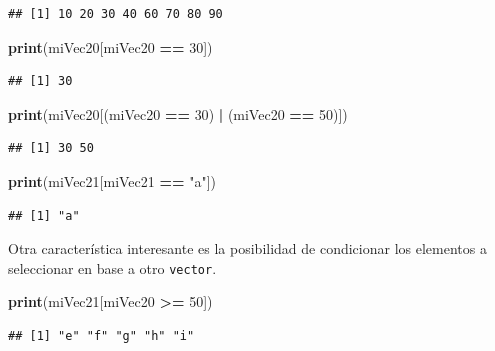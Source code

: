 \documentclass[]{book}
\newenvironment{Shaded}{\begin{snugshade}}{\end{snugshade}}
\newcommand{\KeywordTok}[1]{\textcolor[rgb]{0.13,0.29,0.53}{\textbf{#1}}}
\newcommand{\DecValTok}[1]{\textcolor[rgb]{0.00,0.00,0.81}{#1}}
\newcommand{\StringTok}[1]{\textcolor[rgb]{0.31,0.60,0.02}{#1}}
\newcommand{\OperatorTok}[1]{\textcolor[rgb]{0.81,0.36,0.00}{\textbf{#1}}}
\newcommand{\NormalTok}[1]{#1}
\begin{document}
\begin{verbatim}
## [1] 10 20 30 40 60 70 80 90
\end{verbatim}

\begin{Shaded}
\begin{Highlighting}[]
\KeywordTok{print}\NormalTok{(miVec20[miVec20 }\OperatorTok{==}\StringTok{ }\DecValTok{30}\NormalTok{])}
\end{Highlighting}
\end{Shaded}

\begin{verbatim}
## [1] 30
\end{verbatim}

\begin{Shaded}
\begin{Highlighting}[]
\KeywordTok{print}\NormalTok{(miVec20[(miVec20 }\OperatorTok{==}\StringTok{ }\DecValTok{30}\NormalTok{) }\OperatorTok{|}\StringTok{ }\NormalTok{(miVec20 }\OperatorTok{==}\StringTok{ }\DecValTok{50}\NormalTok{)])}
\end{Highlighting}
\end{Shaded}

\begin{verbatim}
## [1] 30 50
\end{verbatim}

\begin{Shaded}
\begin{Highlighting}[]
\KeywordTok{print}\NormalTok{(miVec21[miVec21 }\OperatorTok{==}\StringTok{ "a"}\NormalTok{])}
\end{Highlighting}
\end{Shaded}

\begin{verbatim}
## [1] "a"
\end{verbatim}

Otra característica interesante es la posibilidad de condicionar los
elementos a seleccionar en base a otro \texttt{vector}.

\begin{Shaded}
\begin{Highlighting}[]
\KeywordTok{print}\NormalTok{(miVec21[miVec20 }\OperatorTok{>=}\StringTok{ }\DecValTok{50}\NormalTok{])}
\end{Highlighting}
\end{Shaded}

\begin{verbatim}
## [1] "e" "f" "g" "h" "i"
\end{verbatim}
\end{document}
